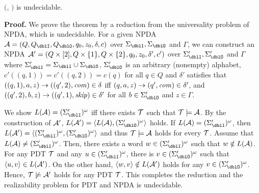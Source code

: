 \begin{theorem}
\label{th: NPDA-PDT}
\Real $($\NPDA, \PDT$)$ is undecidable.
\end{theorem}
{\bf Proof.}\quad
We prove the theorem by a reduction from the universality problem of NPDA, which is undecidable.
For a given NPDA $\calA = (Q, Q_\dblI, Q_\dblO, q_0, z_0, \delta, c)$ over $\Sigma_\dblI, \Sigma_\dblO$ and $\Gamma$,
we can construct an NPDA ${\cal A}' = (Q\times[2], Q\times\{1\}, Q\times\{2\}, q_0, z_0, \delta',c')$ over $\Sigma'_\dblI, \Sigma'_\dblO$ and $\Gamma$
where $\Sigma'_\dblI = \Sigma_\dblI\cup \Sigma_\dblO$,
$\Sigma'_\dblO$ is an arbitrary (nonempty) alphabet,
$c'((q,1))=c'((q,2))=c(q)$ for all $q\in Q$
and $\delta'$ satisfies that
$((q,1),a,z)\to ((q',2),\mathit{com})\in\delta$ iff $(q,a,z)\to (q',\mathit{com})\in\delta'$, and
$((q',2),b,z)\to ((q',1),\mathit{skip})\in\delta'$ for all $b\in \Sigma'_\dblO$ and $z\in \Gamma$.

We show $L(\calA)=(\Sigma'_\dblI)^\omega$ iff there exists ${\cal T}$ such that ${\cal T}\models{\cal A}$.
By the construction of ${\cal A}'$, $L(\calA')=\<L(\calA),(\Sigma'_\dblO)^\omega\>$ holds.
If $L(\calA)=(\Sigma'_\dblI)^\omega$, then $L(\calA')=\<(\Sigma'_\dblI)^\omega,(\Sigma'_\dblO)^\omega\>$
and thus ${\cal T}\models{\cal A}$ holds for every ${\cal T}$.
Assume that $L(\calA)\neq(\Sigma'_\dblI)^\omega$.
Then, there exists a word $w\in(\Sigma'_\dblI)^\omega$ such that $w\notin L({\cal A})$.
For any PDT ${\cal T}$ and any $u\in(\Sigma'_\dblI)^\omega$, there is $v\in(\Sigma'_\dblO)^\omega$ such that $\langle u, v\rangle\in L({\cal A}')$.
On the other hand, $\langle w, v\rangle\notin L({\cal A}')$ holds for any $v\in(\Sigma'_\dblO)^\omega$.
Hence, ${\cal T}\not\models{\cal A}'$ holds for any PDT ${\cal T}$.
This completes the reduction and the realizability problem for PDT and NPDA is undecidable.

